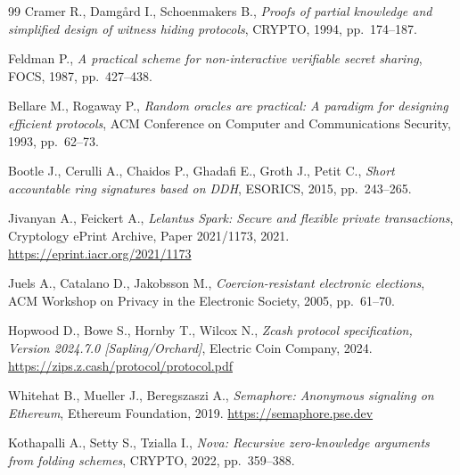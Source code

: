 \documentclass[12pt,a4paper,oneside]{report}
\begin{document}
\begin{thebibliography}{99}
Cramer R., Damg\aa rd I., Schoenmakers B.,
\textit{Proofs of partial knowledge and simplified design of witness hiding protocols},
CRYPTO, 1994, pp.~174--187.

Feldman P.,
\textit{A practical scheme for non-interactive verifiable secret sharing},
FOCS, 1987, pp.~427--438.

Bellare M., Rogaway P.,
\textit{Random oracles are practical: A paradigm for designing efficient protocols},
ACM Conference on Computer and Communications Security, 1993, pp.~62--73.

Bootle J., Cerulli A., Chaidos P., Ghadafi E., Groth J., Petit C.,
\textit{Short accountable ring signatures based on DDH},
ESORICS, 2015, pp.~243--265.

Jivanyan A., Feickert A.,
\textit{Lelantus Spark: Secure and flexible private transactions},
Cryptology ePrint Archive, Paper 2021/1173, 2021.
\url{https://eprint.iacr.org/2021/1173}

Juels A., Catalano D., Jakobsson M.,
\textit{Coercion-resistant electronic elections},
ACM Workshop on Privacy in the Electronic Society, 2005, pp.~61--70.

Hopwood D., Bowe S., Hornby T., Wilcox N.,
\textit{Zcash protocol specification, Version 2024.7.0 [Sapling/Orchard]},
Electric Coin Company, 2024.
\url{https://zips.z.cash/protocol/protocol.pdf}

Whitehat B., Mueller J., Beregszaszi A.,
\textit{Semaphore: Anonymous signaling on Ethereum},
Ethereum Foundation, 2019.
\url{https://semaphore.pse.dev}

Kothapalli A., Setty S., Tzialla I.,
\textit{Nova: Recursive zero-knowledge arguments from folding schemes},
CRYPTO, 2022, pp.~359--388.

\end{thebibliography}

\end{document}
